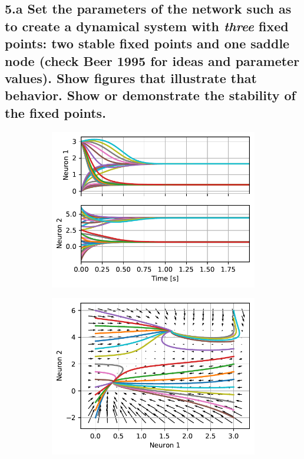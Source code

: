 \documentclass{cmc}
\begin{document}
\subsection*{5.a Set the parameters of the network such as to create a dynamical
  system with \textit{three} fixed points: two stable fixed points and one
  saddle node (check Beer 1995 for ideas and parameter values). Show figures
  that illustrate that behavior. Show or demonstrate the stability of the fixed
  points.}


\begin{figure}[H]
  \centering
  \begin{subfigure}[b]{0.49\textwidth}
    { \centering \includegraphics[width=\textwidth]{figures/Case1_state}
      \label{fig:pendulum-basic-state}
    }
    \caption{}
  \end{subfigure}
  \begin{subfigure}[b]{0.49\textwidth}
    { \centering \includegraphics[width=\textwidth]{figures/Case1_phase}
}
\end{subfigure}
\end{figure}
\end{document}
